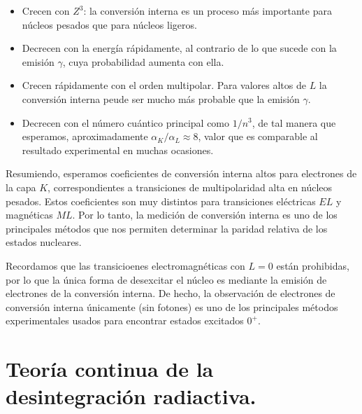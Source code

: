 \begin{itemize}
	\item Crecen con $Z^3$: la conversión interna es un proceso más importante para núcleos pesados que para núcleos ligeros.
	\item Decrecen con la energía rápidamente, al contrario de lo que sucede con la emisión $\gamma$, cuya probabilidad aumenta con ella.
	\item Crecen rápidamente con el orden multipolar. Para valores altos de $L$ la conversión interna peude ser mucho más probable que la emisión $\gamma$. 
	\item Decrecen con el número cuántico principal como $1/n^3$, de tal manera que esperamos, aproximadamente $\alpha_K/\alpha_L\approx 8$, valor que es comparable al resultado experimental en muchas ocasiones.
\end{itemize}

Resumiendo, esperamos coeficientes de conversión interna altos para electrones de la capa $K$, correspondientes a transiciones de multipolaridad alta en núcleos pesados. Estos coeficientes son muy distintos para transiciones eléctricas $EL$ y magnéticas $ML$. Por lo tanto, la medición de conversión interna es uno de los principales métodos que nos permiten determinar la paridad relativa de los estados nucleares. 

Recordamos que las transicioenes electromagnéticas con $L=0$ están prohibidas, por lo que la única forma de desexcitar el núcleo es mediante la emisión de electrones de la conversión interna. De hecho, la observación de electrones de conversión interna únicamente (sin fotones) es uno de los principales métodos experimentales usados para encontrar estados excitados $0^+$.



\section{Teoría continua de la desintegración radiactiva.}

